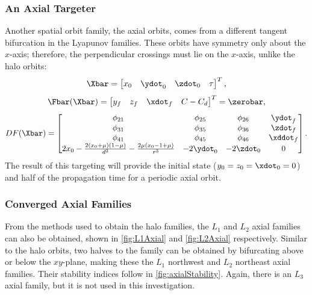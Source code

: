 \subsubsection{An Axial Targeter}
Another spatial orbit family, the axial orbits, comes from a different tangent bifurcation in the
Lyapunov families. These orbits have symmetry only about the $x$-axis; therefore, the perpendicular
crossings must lie on the $x$-axis, unlike the halo orbits:
\begin{equation}
    \Xbar=\begin{bmatrix}   x_{0}   &   \ydot_{0}   &   \zdot_{0}   &   \tau    \end{bmatrix}^{T},
    \label{eq:axialfreevar}
\end{equation}
\begin{equation}
    \Fbar(\Xbar)=\begin{bmatrix}    y_{f}   &   z_{f}   &   \xdot_{f}   &   C-C_{d} \end{bmatrix}^{T}=\zerobar,
    \label{eq:axialconst}
\end{equation}
\begin{equation}
    DF(\Xbar)=\begin{bmatrix}   \phi_{21}                                                                   &   \phi_{25}   &   \phi_{26}   &   \ydot_{f}   \\
                                \phi_{31}                                                                   &   \phi_{35}   &   \phi_{36}   &   \zdot_{f}   \\
                                \phi_{41}                                                                   &   \phi_{45}   &   \phi_{46}   &   \xddot_{f}  \\
                                2x_{0}-\frac{2(x_{0}+\mu)(1-\mu)}{d^{3}}-\frac{2\mu(x_{0}-1+\mu)}{r^{3}}    &   -2\ydot_{0} &   -2\zdot_{0} &   0           \end{bmatrix}.
    \label{eq:axialjacobian}
\end{equation}
The result of this targeting will provide the initial state ($y_{0}=z_{0}=\xdot_{0}=0$) and half of
the propagation time for a periodic axial orbit.

\subsubsection{Converged Axial Families}
From the methods used to obtain the halo families, the $L_{1}$ and $L_{2}$ axial families can also
be obtained, shown in \cref{fig:L1Axial} and \cref{fig:L2Axial} respectively. Similar to the halo
orbits, two halves to the family can be obtained by bifurcating above or below the $xy$-plane,
making these the $L_{1}$ northwest and $L_{2}$ northeast axial families. Their stability indices
follow in \cref{fig:axialStability}. Again, there is an $L_{3}$ axial family, but it is not used in
this investigation.

